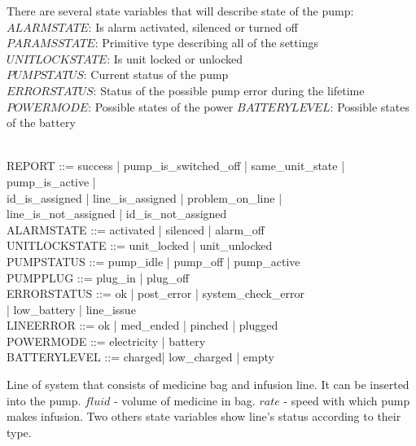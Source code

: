 \documentclass{article}
\begin{document}
	
	There are several state variables that will describe state of the pump:\\
	
	
	$ALARMSTATE$: Is alarm activated, silenced or turned off\\
	$PARAMSSTATE$: Primitive type describing all of the settings\\
	$UNITLOCKSTATE$: Is unit locked or unlocked \\
	$PUMPSTATUS$: Current status of the pump\\
	$ERRORSTATUS$: Status of the possible pump error during the lifetime\\
	$POWERMODE$: Possible states of the power
	$BATTERYLEVEL$: Possible states of the battery 
	
	\begin{zed}	
		[PARAMSSTATE] \\
		
		REPORT ::= success | pump\_is\_switched_off | same\_unit_state | pump\_is\_active | \\id\_is\_assigned | line\_is\_assigned | problem\_on\_line |\\ line\_is\_not\_assigned | id\_is\_not\_assigned\\
		
		ALARMSTATE ::= activated | silenced | alarm\_off \\
		
	
		UNITLOCKSTATE ::= unit\_locked | unit\_unlocked \\
	
		PUMPSTATUS ::= pump\_idle | pump\_off | pump\_active \\
		
		PUMPPLUG ::=  plug\_in | plug\_off\\
		
		ERRORSTATUS ::= ok |  post\_error | system\_check\_error \\ |  low\_battery | line\_issue \\
		
		LINEERROR ::= ok | med\_ended | pinched | plugged \\
		
		POWERMODE ::= electricity | battery  \\
		
		BATTERYLEVEL ::= charged| low\_charged | empty\\
	
	\end{zed}
	
	
	Line of system that consists of medicine bag and infusion line. It can be inserted into the pump. $fluid$ - volume of medicine in bag. $rate$ - speed with which pump makes infusion. Two others state variables show line's status according to their type.
	
\end{document}
